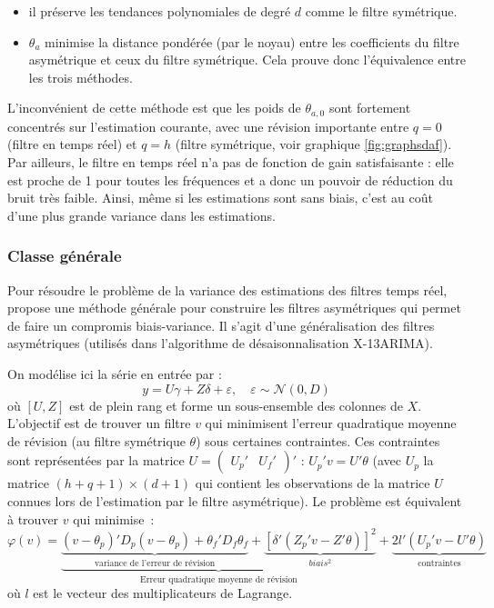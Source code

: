 \documentclass[
  11pt,
  french,
  a4paper]{article}
\newcommand\1{\mathds{1}}
\begin{document}
\begin{itemize}
\item
  il préserve les tendances polynomiales de degré \(d\) comme le filtre symétrique.
\item
  \(\theta_{a}\) minimise la distance pondérée (par le noyau) entre les coefficients du filtre asymétrique et ceux du filtre symétrique.
  Cela prouve donc l'équivalence entre les trois méthodes.
\end{itemize}

L'inconvénient de cette méthode est que les poids de \(\theta_{a,0}\) sont fortement concentrés sur l'estimation courante, avec une révision importante entre \(q=0\) (filtre en temps réel) et \(q=h\) (filtre symétrique, voir graphique \ref{fig:graphsdaf}).
Par ailleurs, le filtre en temps réel n'a pas de fonction de gain satisfaisante : elle est proche de 1 pour toutes les fréquences et a donc un pouvoir de réduction du bruit très faible.
Ainsi, même si les estimations sont sans biais, c'est au coût d'une plus grande variance dans les estimations.

\hypertarget{subsec-lppasymf}{%
\subsubsection{Classe générale}\label{subsec-lppasymf}}

Pour résoudre le problème de la variance des estimations des filtres temps réel, \textcite{proietti2008} propose une méthode générale pour construire les filtres asymétriques qui permet de faire un compromis biais-variance.
Il s'agit d'une généralisation des filtres asymétriques \textcite{musgrave1964set} (utilisés dans l'algorithme de désaisonnalisation X-13ARIMA).

On modélise ici la série en entrée par :
\begin{equation}
y=U\gamma+Z\delta+\varepsilon,\quad
\varepsilon\sim\mathcal{N}(0,D)
\label{eq:lpgeneralmodel}
\end{equation}
où \([U,Z]\) est de plein rang et forme un sous-ensemble des colonnes de \(X\).
L'objectif est de trouver un filtre \(v\) qui minimisent l'erreur quadratique moyenne de révision (au filtre symétrique \(\theta\)) sous certaines contraintes.
Ces contraintes sont représentées par la matrice \(U=\begin{pmatrix}U_{p}'&U_{f}'\end{pmatrix}'\) : \(U_p'v=U'\theta\) (avec \(U_p\) la matrice \((h+q+1)\times (d+1)\) qui contient les observations de la matrice \(U\) connues lors de l'estimation par le filtre asymétrique).
Le problème est équivalent à trouver \(v\) qui minimise~:
\begin{equation}
\varphi(v)=
\underbrace{
  \underbrace{(v-\theta_{p})'D_{p}(v-\theta_{p})+
  \theta_{f}'D_{f}\theta_{f}}_\text{variance de l'erreur de révision}+
  \underbrace{[\delta'(Z_{p}'v-Z'\theta)]^{2}}_{biais^2}
}_\text{Erreur quadratique moyenne de révision}+
\underbrace{2l'(U_{p}'v-U'\theta)}_{\text{contraintes}}
\label{eq:lppasym}
\end{equation}
où \(l\) est le vecteur des multiplicateurs de Lagrange.
\end{document}
